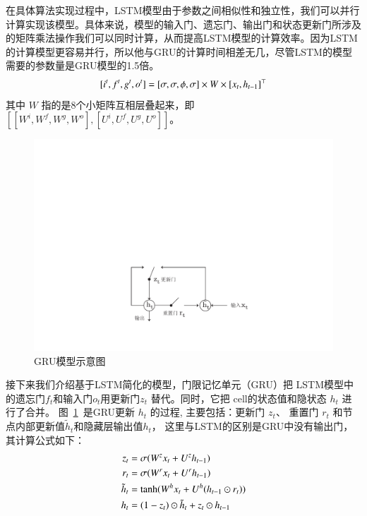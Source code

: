 在具体算法实现过程中，LSTM模型由于参数之间相似性和独立性，我们可以并行计算实现该模型。具体来说，模型的输入门、遗忘门、输出门和状态更新门所涉及的矩阵乘法操作我们可以同时计算，从而提高LSTM模型的计算效率。因为LSTM的计算模型更容易并行，所以他与GRU的计算时间相差无几，尽管LSTM的模型需要的参数量是GRU模型的1.5倍。
\begin{equation}\label{equ:weight}
\setlength{\abovedisplayskip}{6pt}
\setlength{\belowdisplayskip}{6pt}
[i^t,f^t,g^t,o^t ]=[\sigma, \sigma,\phi,\sigma]\times W\times[x_t,h_{t-1}]^\top
\end{equation}
其中 $W$ 指的是8个小矩阵互相层叠起来，即 $[[W^i,W^f,W^g,W^o],[U^i,U^f,U^g,U^o]]$。


\begin{figure}[!ht]
  \centering
  \includegraphics[width=0.6\linewidth]{./figures/gru.pdf}
  \caption{GRU模型示意图}\label{fig:gru}
\end{figure}

接下来我们介绍基于LSTM简化的模型，门限记忆单元（GRU）把 LSTM模型中的遗忘门$f_t$和输入门$o_t$用更新门$z_t$ 替代。同时，它把 cell的状态值和隐状态 $h_t$ 进行了合并。 图~\ref{fig:gru}~是GRU更新 $h_t$ 的过程, 主要包括：更新门 $z_t$、 重置门 $r_t$ 和节点内部更新值$\tilde h_t$和隐藏层输出值$h_t$， 这里与LSTM的区别是GRU中没有输出门，其计算公式如下：
\begin{equation}\label{equ:gru}
\setlength{\abovedisplayskip}{6pt}
\setlength{\belowdisplayskip}{6pt}
\begin{split}
   z_t &= \sigma ( W^z x_t+ U^z h_{t-1}) \\
   r_t &= \sigma(W^r x_t  + U^r h_{t-1}  )\\
   \tilde h_t  &= \tanh (W^h x_t  + U^h(h_{t-1} \odot r_t) ) \\
   h_t &= (1-z_t)\odot \tilde h_t  + z_t \odot h_{t-1}
\end{split}
\end{equation}

